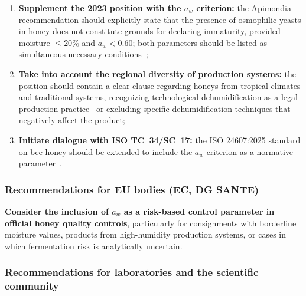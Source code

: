\begin{enumerate}
    \item \textbf{Supplement the 2023 position with the $a_w$
          criterion:} the Apimondia recommendation should
          explicitly state that the presence of osmophilic yeasts
          in honey does not constitute grounds for declaring
          immaturity, provided moisture $\leq 20\%$ and
          $a_w < 0.60$; both parameters should be listed as
          simultaneous necessary
          conditions~\cite{ruegg1981,waaw2006};
    \item \textbf{Take into account the regional diversity of
          production systems:} the position should contain a clear
          clause regarding honeys from tropical climates and
          traditional systems, recognizing technological
          dehumidification as a legal production practice~\cite{tadele2025}
          or excluding specific dehumidification techniques
          that negatively affect the product;
    \item \textbf{Initiate dialogue with ISO TC~34/SC~17:}
          the ISO 24607:2025 standard on bee honey should be
          extended to include the $a_w$ criterion as a normative
          parameter~\cite{codex_stan12}.
\end{enumerate}

\subsubsection{Recommendations for EU bodies (EC, DG SANTE)}


\textbf{Consider the inclusion of $a_w$  as a risk-based control parameter in official honey quality controls}, particularly for consignments with borderline moisture values, products from high-humidity production systems, or cases in which fermentation risk is analytically uncertain.


\subsubsection{Recommendations for laboratories and the scientific community}

